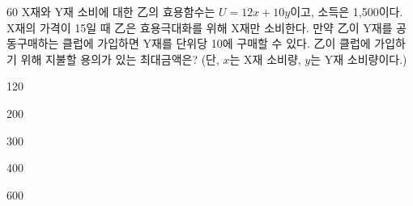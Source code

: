 \begin{question}{60}
X재와 Y재 소비에 대한 乙의 효용함수는 $U=12x+10y$이고, 소득은 1,500이다. X재의 가격이 15일 때 乙은 효용극대화를 위해 X재만 소비한다. 만약 乙이 Y재를 공동구매하는 클럽에 가입하면 Y재를 단위당 10에 구매할 수 있다. 乙이 클럽에 가입하기 위해 지불할 용의가 있는 최대금액은? (단, $x$는 X재 소비량, $y$는 Y재 소비량이다.)
\begin{choices}
  \item 120
  \item 200
  \item 300
  \item 400
  \item 600
\end{choices}
\end{question}
